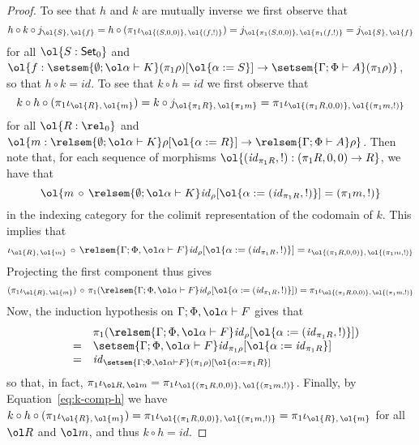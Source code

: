 \documentclass{lmcs}
\theoremstyle{plain}\newtheorem{satz}[thm]{Satz}
\newcommand{\set}{\mathsf{Set}}
\renewcommand{\id}{\mathit{id}}
\begin{document}
\begin{proof}
To see that $h$ and $k$ are mutually inverse we first observe that
\[
h \circ k \circ j_{\ol{S},\, \ol{f}}
= h \circ (\pi_1 \iota_{\ol{(S, 0, 0)}, \,\ol{(f, !)}})
= j_{\ol{\pi_1 (S, 0, 0)}, \,\ol{\pi_1 (f, !)}}
= j_{\ol{S},\, \ol{f}}
\]
for all $\ol{S : \set_0}$ and $\ol{f : \setsem{ \emptyset; \ol\alpha
    \vdash K } (\pi_1 \rho)[\ol{\alpha := S}] \to \setsem{ \Gamma;
    \Phi \vdash A } (\pi_1 \rho)}$, so that $h \circ k = \id$.
To see that  $k \circ h  = \id$ we first observe that
\begin{equation}\label{eq:k-comp-h}
k \circ h \circ (\pi_1 \iota_{\ol{R},\, \ol{m}}) = k \circ
j_{\ol{\pi_1 R}, \,\ol{\pi_1 m}} = \pi_1 \iota_{\ol{(\pi_1 R, 0,
    0)},\, \ol{(\pi_1 m, !)}}
\end{equation}
for all $\ol{R : \rel_0}$ and $\ol{m : \relsem{ \emptyset; \ol\alpha
    \vdash K } \rho[\ol{\alpha := R}] \to \relsem{ \Gamma; \Phi \vdash
    A } \rho}$. Then note that, for each sequence of morphisms
$\ol{(\id_{\pi_1 R}, !) : (\pi_1 R, 0, 0) \to R}$, we have that
\[\ol{m
\,\circ\, \relsem{ \emptyset; \ol\alpha \vdash K } \id_\rho[\ol{\alpha
    := (\id_{\pi_1 R}, !)}] = (\pi_1 m, !)}\]
in the indexing category for the colimit representation of the
codomain of $k$. This implies that
\[\iota_{\ol{R},\, \ol{m}} \,\circ\, \relsem{ \Gamma; \Phi,
  \ol\alpha \vdash F } \id_{\rho}[\ol{\alpha := (\id_{\pi_1 R}, !)}]
= \iota_{\ol{(\pi_1 R, 0, 0)},\, \ol{(\pi_1 m, !)}}\] Projecting the
first component thus gives
\[(\pi_1 \iota_{\ol{R},\,
  \ol{m}}) \, \circ\, \pi_1 ( \relsem{ \Gamma; \Phi, \ol\alpha \vdash
  F } \id_{\rho}[\ol{\alpha := (\id_{\pi_1 R}, !)}]) = \pi_1
\iota_{\ol{(\pi_1 R, 0, 0)},\, \ol{(\pi_1 m, !)}}\]
Now, the induction hypothesis on $\Gamma;\Phi,\ol\alpha
\vdash F$ gives that
\[\begin{array}{lll}
 &  & \pi_1 ( \relsem{ \Gamma; \Phi, \ol\alpha \vdash F}
\id_{\rho}[\ol{\alpha := (\id_{\pi_1 R}, !)}])\\
& = & \setsem{ \Gamma; \Phi, \ol\alpha \vdash F } \id_{\pi_1
  \rho}[\ol{\alpha := \id_{\pi_1 R}}]\\
& = & \id_{\setsem{ \Gamma; \Phi, \ol\alpha \vdash F } (\pi_1
  \rho)[\ol{\alpha := \pi_1 R}]}
\end{array}\]
so that, in fact, $\pi_1 \iota_{\ol R,\,\ol m} =
\pi_1\iota_{\ol{(\pi_1 R, 0, 0)},\, \ol{(\pi_1 m, !)}}$.  Finally, by
Equation~\ref{eq:k-comp-h} we have $k \circ h \circ (\pi_1
\iota_{\ol{R},\, \ol{m}}) = \pi_1 \iota_{\ol{(\pi_1 R, 0, 0)},\,
  \ol{(\pi_1 m, !)}}  = \pi_1 \iota_{\ol{R},\, \ol{m}}$ for all $\ol
R$ and $\ol m$, and thus $k \circ h = \id$.


\end{proof}
\end{document}
